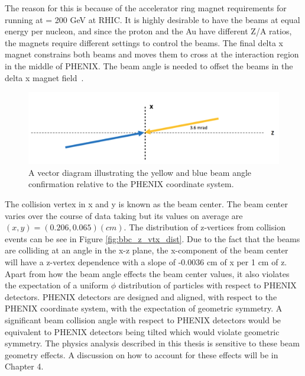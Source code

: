 The reason for this is because of the accelerator ring magnet requirements for running \pau at \sqsn = 200 GeV at RHIC. It is highly desirable to have the beams at equal energy per nucleon, and since the proton and the Au have different Z/A ratios, the magnets require different settings to control the beams. The final delta x magnet constrains both beams and moves them to cross at the interaction region in the middle of PHENIX. The beam angle is needed to offset the beams in the delta x magnet field~\cite{BNL_Run15_Operations}.

\begin{figure}[h!]
\begin{center}
\includegraphics[width=0.85\linewidth]{figs/beam_angle.png}
\caption{A vector diagram illustrating the yellow and blue beam angle confirmation relative to the PHENIX coordinate system.}
\label{fig:beam_angle}
\end{center}
\end{figure}

The collision vertex in x and y is known as the beam center. The beam center varies over the course of data taking but its values on average are $(x,y) = (0.206,0.065) (cm)$. The distribution of z-vertices from collision events can be see in Figure \ref{fig:bbc_z_vtx_dist}. Due to the fact that the beams are colliding at an angle in the x-z plane, the x-component of the beam center will have a z-vertex dependence with a slope of -0.0036 cm of x per 1 cm of z.
Apart from how the beam angle effects the beam center values, it also violates the expectation of a uniform $\phi$ distribution of particles with respect to PHENIX detectors. PHENIX detectors are designed and aligned, with respect to the PHENIX coordinate system, with the expectation of geometric symmetry. A significant beam collision angle with respect to PHENIX detectors would be equivalent to PHENIX detectors being tilted which would violate geometric symmetry.
The physics analysis described in this thesis is sensitive to these beam geometry effects. A discussion on how to account for these effects will be in Chapter 4.


